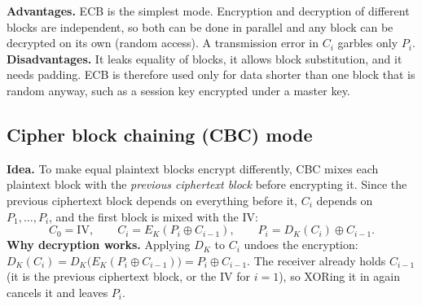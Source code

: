\textbf{Advantages.} ECB is the simplest mode. Encryption and decryption of different blocks are independent, so both can be done in parallel and any block can be decrypted on its own (random access). A transmission error in $C_i$ garbles only $P_i$. \textbf{Disadvantages.} It leaks equality of blocks, it allows block substitution, and it needs padding. ECB is therefore used only for data shorter than one block that is random anyway, such as a session key encrypted under a master key.

\subsection{Cipher block chaining (CBC) mode \hot\new}

\textbf{Idea.} To make equal plaintext blocks encrypt differently, CBC mixes each plaintext block with the \emph{previous ciphertext block} before encrypting it. Since the previous ciphertext block depends on everything before it, $C_i$ depends on $P_1, \dots, P_i$, and the first block is mixed with the IV:
\[
C_0 = \mathrm{IV}, \qquad C_i = E_K(P_i \oplus C_{i-1}), \qquad P_i = D_K(C_i) \oplus C_{i-1} .
\]
\textbf{Why decryption works.} Applying $D_K$ to $C_i$ undoes the encryption: $D_K(C_i) = D_K\big(E_K(P_i \oplus C_{i-1})\big) = P_i \oplus C_{i-1}$. The receiver already holds $C_{i-1}$ (it is the previous ciphertext block, or the IV for $i = 1$), so XORing it in again cancels it and leaves $P_i$.

\begin{center}
\end{center}

